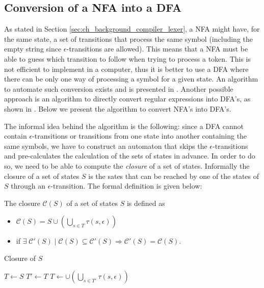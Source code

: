 \subsection{Conversion of a NFA into a DFA}
As stated in Section \ref{sec:ch_background_compiler_lexer}, a NFA might have, for the same state, a set of transitions that process the same symbol (including the empty string since $\epsilon$-transitions are allowed). This means that a NFA must be able to guess which transition to follow when trying to process a token. This is not efficient to implement in a computer, thus it is better to use a DFA where there can be only one way of processing a symbol for a given state. An algorithm to automate such conversion exists and is presented in \cite{aho2007compilers}. Another possible approach is an algorithm to directly convert regular expressions into DFA's, as shown in \cite{aho1986compilers}. Below we present the algorithm to convert NFA's into DFA's.

The informal idea behind the algorithm is the following: since a DFA cannot contain $\epsilon$-transitions or transitions from one state into another containing the same symbols, we have to construct an automaton that skips the $\epsilon$-transitions and pre-calculates the calculation of the sets of states in advance. In order to do so, we need to be able to compute the \textit{closure} of a set of states. Informally the closure of a set of states $S$ is the sates that can be reached by one of the states of $S$ through an $\epsilon$-transition. The formal definition is given below:

\begin{definition}
	The closure $\mathcal{C}(S)$ of a set of states $S$ is defined as
	\begin{itemize}[noitemsep]
		\item 
				$\displaystyle \mathcal{C}(S) = S \cup \left(\bigcup_{s \in T} \tau(s,\epsilon)	\right)$
		\item if $\exists \; \mathcal{C}'(S) \; | \; \mathcal{C}(S) \subseteq \mathcal{C}'(S) \Rightarrow \mathcal{C}'(S) = \mathcal{C}(S)$.
	\end{itemize}	
	
\end{definition}

\begin{algorithm}
	\caption{Closure of $S$}
	\label{alg:ch_background_closure}
	\begin{algorithmic}
		\State $T \gets S$
		\Repeat
			\State $T' \gets T$
			\State $T \gets \cup \left( \bigcup_{s \in  T'}\tau(s,\epsilon) \right)$
	\end{algorithmic}
\end{algorithm}

